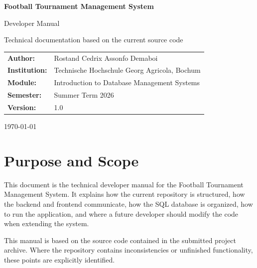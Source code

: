 \documentclass[11pt,a4paper]{article}
\begin{document}

\begin{titlepage}
\centering
\vspace*{2cm}

{\Huge\bfseries Football Tournament Management System\par}
\vspace{0.8cm}
{\LARGE Developer Manual\par}

\vspace{1.5cm}
{\large Technical documentation based on the current source code\par}

\vspace{1.5cm}
\begin{tabular}{ll}
\textbf{Author:} & Rostand Cedrix Assonfo Demaboi \\
\textbf{Institution:} & Technische Hochschule Georg Agricola, Bochum \\
\textbf{Module:} & Introduction to Database Management Systems \\
\textbf{Semester:} & Summer Term 2026 \\
\textbf{Version:} & 1.0 \\
\end{tabular}

\vfill
{\large \today\par}
\end{titlepage}

\tableofcontents
\newpage

\section{Purpose and Scope}

This document is the technical developer manual for the Football
Tournament Management System. It explains how the current repository
is structured, how the backend and frontend communicate, how the SQL
database is organized, how to run the application, and where a future
developer should modify the code when extending the system.

This manual is based on the source code contained in the submitted
project archive. Where the repository contains inconsistencies or
unfinished functionality, these points are explicitly identified.
\end{document}
